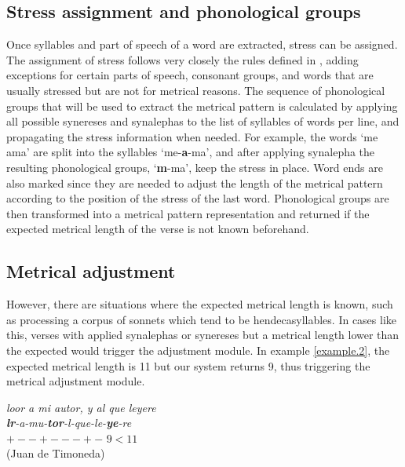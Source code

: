 \documentclass[a4paper,11pt,twocolumn,twoside]{article}
\begin{document}
\subsection{Stress assignment and phonological groups}
Once syllables and part of speech of a word are extracted, stress can be assigned. The assignment of stress follows very closely the rules defined in , adding exceptions for certain parts of speech, consonant groups, and words that are usually stressed but are not for metrical reasons. The sequence of phonological groups that will be used to extract the metrical pattern is calculated by applying all possible synereses and synalephas to the list of syllables of words per line, and propagating the stress information when needed. For example, the words `me ama' are split into the syllables `me-\textbf{a}-ma', and after applying synalepha the resulting phonological groups, `\textbf{m}-ma', keep the stress in place. Word ends are also marked since they are needed to adjust the length of the metrical pattern according to the position of the stress of the last word. Phonological groups are then transformed into a metrical pattern representation and returned if the expected metrical length of the verse is not known beforehand.

\subsection{Metrical adjustment}
However, there are situations where the expected metrical length is known, such as processing a corpus of sonnets which tend to be hendecasyllables. In cases like this, verses with applied synalephas or synereses but a metrical length lower than the expected would trigger the adjustment module.
In example \ref{example.2}, the expected metrical length is 11 but our system returns 9, thus triggering the metrical adjustment module.

\begin{subexamples}\label{example.2}
\textit{loor a mi autor, y al que leyere} \\
\textit{\textbf{lr}-a-mu-\textbf{tor}-l-que-le-\textbf{ye}-re} \\
$+--+---+-$ $9 < 11$ \\
(Juan de Timoneda)
\end{subexamples}
\end{document}

